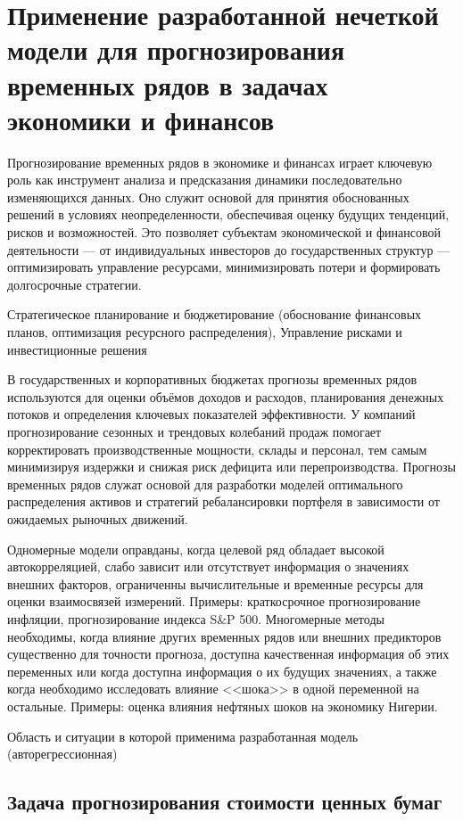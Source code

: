 \chapter{Применение разработанной нечеткой модели для прогнозирования временных рядов в задачах экономики и финансов}

Прогнозирование временных рядов в экономике и финансах играет ключевую роль как инструмент анализа и предсказания динамики последовательно изменяющихся данных. Оно служит основой для принятия обоснованных решений в условиях неопределенности, обеспечивая оценку будущих тенденций, рисков и возможностей. Это позволяет субъектам экономической и финансовой деятельности — от индивидуальных инвесторов до государственных структур — оптимизировать управление ресурсами, минимизировать потери и формировать долгосрочные стратегии.

Стратегическое планирование и бюджетирование (обоснование финансовых планов, оптимизация ресурсного распределения), Управление рисками и инвестиционные решения

В государственных и корпоративных бюджетах прогнозы временных рядов используются для оценки объёмов доходов и расходов, планирования денежных потоков и определения ключевых показателей эффективности. У компаний прогнозирование сезонных и трендовых колебаний продаж помогает корректировать производственные мощности, склады и персонал, тем самым минимизируя издержки и снижая риск дефицита или перепроизводства. Прогнозы временных рядов служат основой для разработки моделей оптимального распределения активов и стратегий ребалансировки портфеля в зависимости от ожидаемых рыночных движений.

Одномерные модели оправданы, когда целевой ряд обладает высокой автокорреляцией, слабо зависит или отсутствует информация о значениях внешних факторов, ограниченны вычислительные и временные ресурсы для оценки взаимосвязей измерений. Примеры: краткосрочное прогнозирование инфляции, прогнозирование индекса S\&P 500. Многомерные методы необходимы, когда влияние других временных рядов или внешних предикторов существенно для точности прогноза, доступна качественная информация об этих переменных или когда доступна информация о их будущих значениях, а также когда необходимо исследовать влияние <<шока>> в одной переменной на остальные. Примеры: оценка влияния нефтяных шоков на экономику Нигерии.

Область и ситуации в которой применима разработанная модель (авторегрессионная)

\section{Задача прогнозирования стоимости ценных бумаг}
